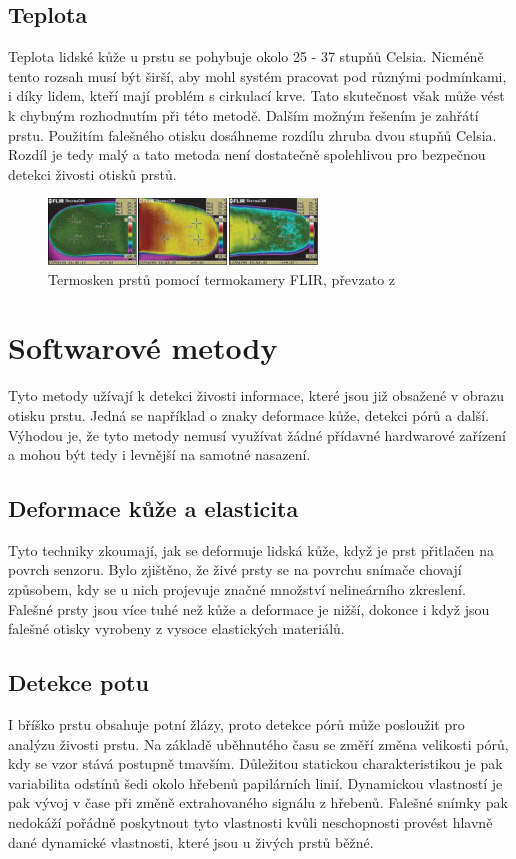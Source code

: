 \subsection{Teplota}
Teplota lidské kůže u prstu se pohybuje okolo 25 - 37 stupňů Celsia. Nicméně tento rozsah musí být širší, aby mohl systém pracovat pod různými podmínkami, i díky lidem, kteří mají problém s cirkulací krve. Tato skutečnost však může vést k chybným rozhodnutím při této metodě. Dalším možným řešením je zahřátí prstu. Použitím falešného otisku dosáhneme rozdílu zhruba dvou stupňů Celsia. Rozdíl je tedy malý a tato metoda není dostatečně spolehlivou pro bezpečnou detekci živosti otisků prstů. \cite{AdvancedBiometricsTechnologies2011}
\begin{figure}[!htbp]
    \centering
    \includegraphics[width=270px]{obrazky-figures/thermoscan.PNG}
    \caption{Termosken prstů pomocí termokamery FLIR, převzato z \cite{AdvancedBiometricsTechnologies2011}}
\end{figure}

\section{Softwarové metody}
Tyto metody užívají k detekci živosti informace, které jsou již obsažené v obrazu otisku prstu. Jedná se například o znaky deformace kůže, detekci pórů a další. Výhodou je, že tyto metody nemusí využívat žádné přídavné hardwarové zařízení a mohou být tedy i levnější na samotné nasazení.

\subsection{Deformace kůže a elasticita}
Tyto techniky zkoumají, jak se deformuje lidská kůže, když je prst přitlačen na povrch senzoru. Bylo zjištěno, že živé prsty se na povrchu snímače chovají způsobem, kdy se u nich projevuje značné množství nelineárního zkreslení. Falešné prsty jsou více tuhé než kůže a deformace je nižší, dokonce i když jsou falešné otisky vyrobeny z vysoce elastických materiálů. \cite{BiometricsEncyclopedia2009}

\subsection{Detekce potu}
I bříško prstu obsahuje potní žlázy, proto detekce pórů může posloužit pro analýzu živosti prstu. Na základě uběhnutého času se změří změna velikosti pórů, kdy se vzor stává postupně tmavším. Důležitou statickou charakteristikou je pak variabilita odstínů šedi okolo hřebenů papilárních linií. Dynamickou vlastností je pak vývoj v čase při změně extrahovaného signálu z hřebenů. Falešné snímky pak nedokáží pořádně poskytnout tyto vlastnosti kvůli neschopnosti provést hlavně dané dynamické vlastnosti, které jsou u živých prstů běžné. \cite{PoresResearch}

